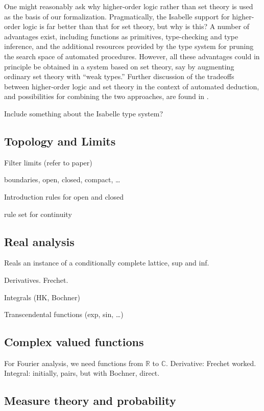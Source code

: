 \documentclass{svjour3}
\newcommand{\RR}{\mathbb{R}}
\newcommand{\CC}{\mathbb{C}}
\begin{document}
One might reasonably ask why higher-order logic rather than set theory is used as the basis of our formalization. Pragmatically, the Isabelle support for higher-order logic is far better than that for set theory, but why is this? A number of advantages exist, including functions as primitives, type-checking and type inference, and the additional resources provided by the type system for pruning the search space of automated procedures. However, all these advantages could in principle be obtained in a system based on set theory, say by augmenting ordinary set theory with ``weak types.'' Further discussion of the tradeoffs between higher-order logic and set theory in the context of automated deduction, and possibilities for combining the two approaches, are found in \cite{gordon-hol-set}.

Include something about the Isabelle type system?

\subsection{Topology and Limits}

Filter limits (refer to paper)

boundaries, open, closed, compact, \ldots

Introduction rules for open and closed

rule set for continuity

\subsection{Real analysis}

Reals an instance of a conditionally complete lattice, sup and inf.

Derivatives. Frechet.

Integrals (HK, Bochner)

Transcendental functions (exp, sin, \ldots)

\subsection{Complex valued functions}

For Fourier analysis, we need functions from $\RR$ to $\CC$. Derivative: Frechet worked. Integral: initially, pairs, but with Bochner, direct.

\subsection{Measure theory and probability}
\end{document}
